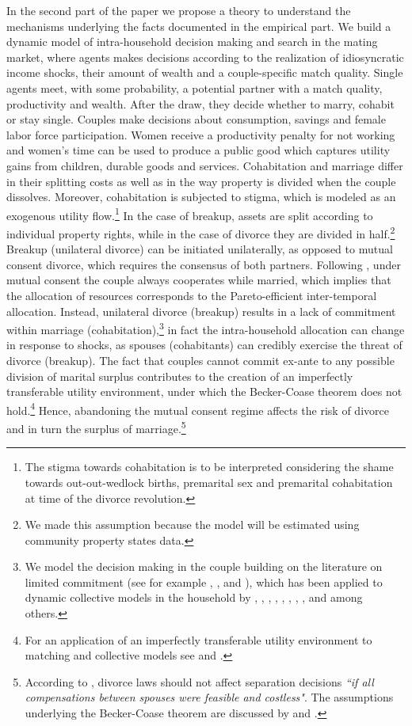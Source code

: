 \documentclass[12pt]{article}
\numberwithin{table}{section}
\begin{document}
In the second part of the paper we propose a theory to understand the mechanisms underlying the facts documented in the empirical part. We build a dynamic model of intra-household decision making and search in the mating market, where agents makes decisions according to the realization of idiosyncratic income shocks, their amount of wealth and a couple-specific match quality. Single agents meet, with some probability, a potential partner with a match quality, productivity and wealth. After the draw, they decide whether to marry, cohabit or stay single. Couples make decisions about consumption, savings and female labor force participation. Women receive a productivity penalty for not working and women's time can be used to produce a public good which captures utility gains from children, durable goods and services. Cohabitation and marriage differ in their splitting costs as well as in the way property is divided when the couple dissolves. Moreover, cohabitation is subjected to stigma, which is modeled as an exogenous utility flow.\footnote{The stigma towards cohabitation is to be interpreted considering the shame towards out-out-wedlock births, premarital sex and premarital cohabitation at time of the divorce revolution.} In the case of breakup, assets are split according to individual property rights, while in the case of divorce they are divided in half.\footnote{We made this assumption because the model will be estimated using community property states data.} Breakup (unilateral divorce) can be initiated unilaterally, as opposed to mutual consent divorce, which requires the consensus of both partners. Following \cite{voena2015}, under mutual consent the couple always cooperates while married, which implies that the allocation of resources corresponds to the Pareto-efficient inter-temporal allocation. Instead, unilateral divorce (breakup) results in a lack of commitment within marriage (cohabitation),\footnote{We model the decision making in the couple building on the literature on limited commitment (see for example \cite{kk1996},  \cite{ligon2002}, \cite{marcet2019} and \cite{pavoni2018}), which has been applied to dynamic collective models in the household by \cite{mazzocco2007}, \cite{mazzocco2013}, \cite{bayot2015}, \cite{rigas2015}, \cite{voena2015}, \cite{abraham2018}, \cite{lise2018}, \cite{low2018}, \cite{foerster2019} and \cite{reynoso2019} among others.} in fact the intra-household allocation can change in response to shocks, as spouses (cohabitants) can credibly exercise the threat of divorce (breakup). The fact that couples cannot commit ex-ante to any possible division of marital surplus contributes to the creation of an imperfectly transferable utility environment, under which the Becker-Coase theorem does not hold.\footnote{For an application of an imperfectly transferable utility environment to matching and collective models see \cite{galichon2019} and \cite{weber2018}.} Hence, abandoning the mutual consent regime affects the risk of divorce and in turn the surplus of marriage.\footnote{According to \cite{becker1977}, divorce laws should not affect separation decisions \textit{``if all compensations between spouses were feasible and costless"}. The assumptions underlying the Becker-Coase theorem are discussed by \cite{chiappori2015} and \cite{fella2004}.} 
\end{document}
